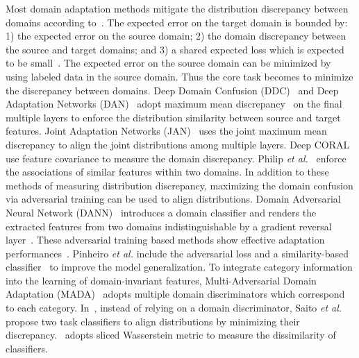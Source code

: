 Most domain adaptation methods mitigate the distribution discrepancy between domains according to~\cite{TheoryDA}. The expected error on the target domain is bounded by: 1) the expected error on the source domain; 2) the domain discrepancy between the source and target domains; and 3) a shared expected loss which is expected to be small~\cite{LearnSemanticRepresentation}. The expected error on the source domain can be minimized by using labeled data in the source domain. Thus the core task becomes to minimize the discrepancy between domains. %
Deep Domain Confusion (DDC)~\cite{DDC} and Deep Adaptation Networks (DAN)~\cite{DAN} adopt maximum mean discrepancy~\cite{KernelMMD} on the final multiple layers to enforce the distribution similarity between source and target features. Joint Adaptation Networks (JAN)~\cite{JAN} uses the joint maximum mean discrepancy to align the joint distributions among multiple layers. Deep CORAL~\cite{DeepCoral} use feature covariance to measure the domain discrepancy. Philip \textit{et al.}~\cite{AssocDA} enforce the associations of similar features within two domains. In addition to these methods of measuring distribution discrepancy, maximizing the domain confusion via adversarial training can be used to align distributions. Domain Adversarial Neural Network (DANN)~\cite{DANN} introduces a domain classifier and renders the extracted features from two domains indistinguishable by a gradient reversal layer~\cite{RevGral}. These adversarial training based methods show effective adaptation performances~\cite{DSN,CondAdvDA}. Pinheiro \textit{et al.} include the adversarial loss and a similarity-based classifier~\cite{SimilarityUDA} to improve the model generalization. To integrate category information into the learning of domain-invariant features, Multi-Adversarial Domain Adaptation (MADA)~\cite{MADA} adopts multiple domain discriminators which correspond to each category. In~\cite{MCD}, instead of relying on a domain discriminator, Saito \textit{et al.} propose two task classifiers to align distributions by minimizing their discrepancy.~\cite{SWD} adopts sliced Wasserstein metric to measure the dissimilarity of classifiers.

